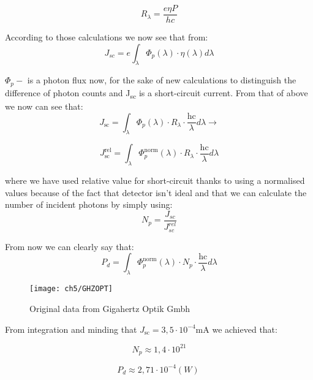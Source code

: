 \begin{equation}
R_{\lambda} = \frac{e\eta P}{hc}
\end{equation}


\noindent According to those calculations we now see that from:
\begin{equation}
J_{sc} = e\int_{\lambda}^{}{\Phi_{p}(\lambda ) \cdot \eta (\lambda) d \lambda }
\end{equation}

\noindent \(\Phi_{p} -\) is a photon flux now, for the sake of new calculations to
distinguish the difference of photon counts and J­\textsubscript{sc} is
a short-circuit current. From that of above we now can see that:
\begin{equation}
J_{\text{sc}} = \int_{\lambda}^{}{\Phi_{p}\left( \lambda \right) \cdot R_{\lambda } \cdot \frac{\text{hc}}{\lambda }d\lambda } \rightarrow
\end{equation}

\begin{equation}
J_{\text{sc}}^{\text{rel}} = \int_{\lambda}^{}{\Phi_{p}^{\text{norm}}\left( \lambda \right) \cdot R_{\lambda} \cdot \frac{\text{hc}}{\lambda}d\lambda }
\end{equation}


\noindent where we have used relative value for short-circuit thanks to using a
normalised values because of the fact that detector isn't ideal and that
we can calculate the number of incident photons by simply using:
\begin{equation}
N_{p} = \frac{J_{sc}}{J_{sc}^{rel}}
\end{equation}

\noindent From now we can clearly say that:
\begin{equation}
P_{d} = \int_{\lambda}^{}{\Phi_{p}^{\text{norm}}\left( \lambda \right) \cdot N_{p} \cdot \frac{\text{hc}}{\lambda}d \lambda }
\end{equation}

\begin{figure}[H]
\center
\texttt{[image: ch5/GHZOPT]}
\caption{Original data from Gigahertz Optik Gmbh}
\end{figure}

\noindent From integration and minding that
\(J_{\text{sc}} = 3,5 \cdot 10^{- 4}\text{mA\ }\)we achieved that:

\[N_{p} \approx 1,4 \cdot 10^{21}\]

\[P_{d} \approx 2,71 \cdot 10^{-4} \left( W \right)\ \]


